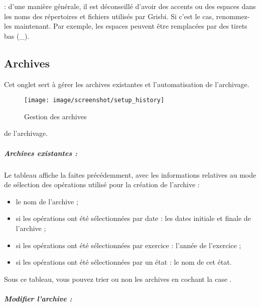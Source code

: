 : d'une manière générale, il est déconseillé d'avoir des accents ou des espaces dans les noms des répertoires et fichiers utilisés par Grisbi. Si c'est le cas, renommez-les maintenant. Par exemple, les espaces peuvent être remplacées par des tirets bas (\_). 

\ifIllustration
\else
\newpage
\fi


\subsection{Archives\label{setup-general-archives}}

Cet onglet sert à gérer les archives existantes et l'automatisation \ifIllustration de l'archivage.
\begin{figure}[htb]
\begin{center}
\texttt{[image: image/screenshot/setup\_history]}
\end{center}
\caption{Gestion des archives}
\label{setup-history-img}
\end{figure}
\else de l'archivage.
\fi


\subparagraph{Archives existantes :\label{setup-general-archives-existing}}

Le tableau affiche la  faites précédemment, avec les informations relatives au mode de sélection des opérations utilisé pour la création de l'archive :

\begin{itemize}
	\item le nom de l'archive ;
	\item si les opérations ont été sélectionnées par date : les dates initiale et finale de l'archive ;
	\item si les opérations ont été sélectionnées par exercice : l'année de l'exercice ;	
	\item si les opérations ont été sélectionnées par un état : le nom de cet état.
	\end{itemize}	

Sous ce tableau, vous pouvez trier ou non les archives en cochant la case .



\subparagraph{Modifier l'archive :\label{setup-general-archives-remove}}

